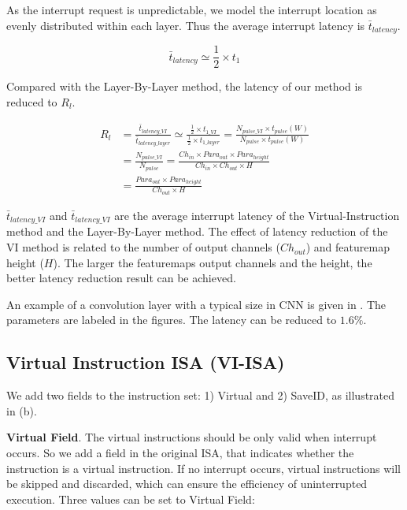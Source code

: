 As the interrupt request is unpredictable, we model the interrupt location as evenly distributed within each layer. Thus the average interrupt latency is $\bar{t}_{latency} $.

\begin{equation}
	\bar{t}_{latency}  \simeq \frac{1}{2} \times t_{1}
\end{equation}

Compared with the Layer-By-Layer method, the latency of our method is reduced to $R_l$.

\begin{equation}
	\begin{split}
	R_l & =  \frac{\bar{t}_{latency\_VI}}{\bar{t}_{latency\_layer}} \simeq \frac{\frac{1}{2} \times t_{1\_VI}}{\frac{1}{2} \times t_{1\_layer}}  = \frac{ N_{pulse\_VI} \times t_{pulse}(W) }{ N_{pulse} \times t_{pulse}(W) }  \\
		   & = \frac{ N_{pulse\_VI} }{N_{pulse} } = \frac{ Ch_{in} \times Para_{out} \times Para_{height}  }{  Ch_{in} \times Ch_{out} \times H } \\
		   & = \frac{ Para_{out} \times Para_{height} }{ Ch_{out} \times H} 
	\end{split}
\end{equation}

$\bar{t}_{latency\_VI}$ and $\bar{t}_{latency\_VI}$ are the average interrupt latency of the Virtual-Instruction method and the Layer-By-Layer method. The effect of latency reduction of the VI method is related to the number of output channels ($Ch_{out}$) and featuremap height ($H$). The larger the featuremaps output channels and the height, the better latency reduction result can be achieved.

An example of a convolution layer with a typical size in CNN is given in . The parameters are labeled in the figures. The latency can be reduced to $1.6\%$.



\subsection{Virtual Instruction ISA (VI-ISA) }
\label{sec:virtualinstr}

We add two fields to the instruction set: 1) Virtual and 2) SaveID, as illustrated in (b). 

\textbf{   Virtual Field}. The virtual instructions should be only valid when interrupt occurs. So we add a field in the original ISA, that indicates whether the instruction is a virtual instruction. If no interrupt occurs, virtual instructions will be skipped and discarded, which can ensure the efficiency of uninterrupted execution. Three values can be set to Virtual Field:

